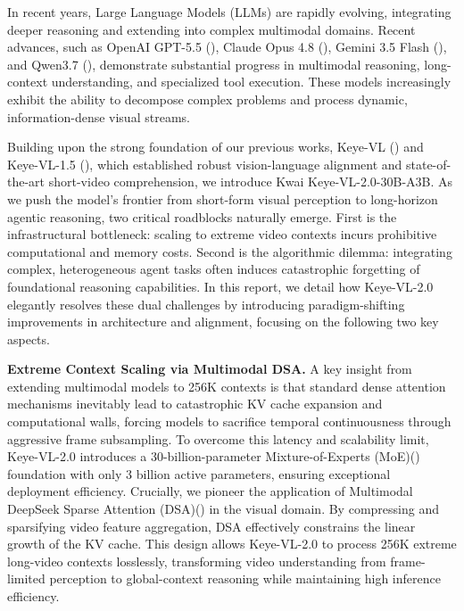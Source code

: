 In recent years, Large Language Models (LLMs) are rapidly evolving, integrating deeper reasoning and extending into complex multimodal domains. Recent advances, such as OpenAI GPT-5.5 (\cite{openai2026gpt55}), Claude Opus 4.8 (\cite{anthropic2026claude}), Gemini 3.5 Flash (\cite{deepmind2026gemini}), and Qwen3.7 (\cite{qwenteam2026qwen}), demonstrate substantial progress in multimodal reasoning, long-context understanding, and specialized tool execution. These models increasingly exhibit the ability to decompose complex problems and process dynamic, information-dense visual streams. 

Building upon the strong foundation of our previous works, Keye-VL (\cite{kwaikeye2025vl}) and Keye-VL-1.5 (\cite{yang2025kwaikeyevl15}), which established robust vision-language alignment and state-of-the-art short-video comprehension, we introduce Kwai Keye-VL-2.0-30B-A3B. As we push the model's frontier from short-form visual perception to long-horizon agentic reasoning, two critical roadblocks naturally emerge. First is the infrastructural bottleneck: scaling to extreme video contexts incurs prohibitive computational and memory costs. Second is the algorithmic dilemma: integrating complex, heterogeneous agent tasks often induces catastrophic forgetting of foundational reasoning capabilities. In this report, we detail how Keye-VL-2.0 elegantly resolves these dual challenges by introducing paradigm-shifting improvements in architecture and alignment, focusing on the following two key aspects.

\textbf{Extreme Context Scaling via Multimodal DSA.} A key insight from extending multimodal models to 256K contexts is that standard dense attention mechanisms inevitably lead to catastrophic KV cache expansion and computational walls, forcing models to sacrifice temporal continuousness through aggressive frame subsampling. To overcome this latency and scalability limit, Keye-VL-2.0 introduces a 30-billion-parameter Mixture-of-Experts (MoE)(\cite{shazeer2017outrageously}) foundation with only 3 billion active parameters, ensuring exceptional deployment efficiency. Crucially, we pioneer the application of Multimodal DeepSeek Sparse Attention (DSA)(\cite{deepseek2025v32}) in the visual domain. By compressing and sparsifying video feature aggregation, DSA effectively constrains the linear growth of the KV cache. This design allows Keye-VL-2.0 to process 256K extreme long-video contexts losslessly, transforming video understanding from frame-limited perception to global-context reasoning while maintaining high inference efficiency.

